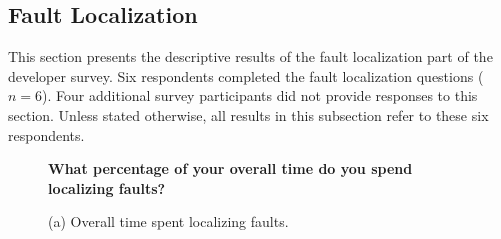 
\FloatBarrier

\raggedbottom
\subsection{Fault Localization}
\label{appendix:fault-localisation}
This section presents the descriptive results of the fault localization
part of the developer survey. Six respondents completed the fault
localization questions ($n=6$). Four additional survey participants did
not provide responses to this section. Unless stated otherwise, all
results in this subsection refer to these six respondents.

\begin{figure}[H]
    \centering
    \scriptsize
    \begin{minipage}[t]{0.47\textwidth}
        \centering
        \textbf{\scriptsize
        What percentage of your overall time do you spend
        localizing faults?}
        \vspace{0.1em}
        \par\vspace{0.1em}
        {\scriptsize
        (a) Overall time spent localizing faults.}

\end{minipage}
\end{figure}
